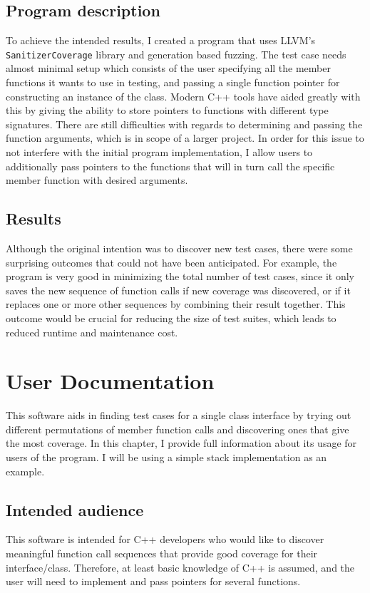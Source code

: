 \documentclass{elteikthesis}[2018/06/06]
\newcommand*{\code}{\lstinline[keywordstyle=\color{violet}, basicstyle=\color{violet}]}
\begin{document}
\section{Program description}
\label{sec-1-3}
To achieve the intended results, I created a program that uses LLVM's \code{SanitizerCoverage} library and generation based fuzzing. The test case needs almost minimal setup which consists of the user specifying all the member functions it wants to use in testing, and passing a single function pointer for constructing an instance of the class. Modern C++ tools have aided greatly with this by giving the ability to store pointers to functions with different type signatures. There are still difficulties with regards to determining and passing the function arguments, which is in scope of a larger project. In order for this issue to not interfere with the initial program implementation, I allow users to additionally pass pointers to the functions that will in turn call the specific member function with desired arguments. \\

\section{Results}
\label{sec-1-4}
Although the original intention was to discover new test cases, there were some surprising outcomes that could not have been anticipated. For example, the program is very good in minimizing the total number of test cases, since it only saves the new sequence of function calls if new coverage was discovered, or if it replaces one or more other sequences by combining their result together. This outcome would be crucial for reducing the size of test suites, which leads to reduced runtime and maintenance cost. \\
\chapter{User Documentation}
\label{sec-2}
This software aids in finding test cases for a single class interface by trying out different permutations of member function calls and discovering ones that give the most coverage. In this chapter, I provide full information about its usage for users of the program. I will be using a simple stack implementation as an example\cite{stack implementation}. \\
\section{Intended audience}
\label{sec-2-1}
This software is intended for C++ developers who would like to discover meaningful function call sequences that provide good coverage for their interface/class. Therefore, at least basic knowledge of C++ is assumed, and the user will need to implement and pass pointers for several functions. \\
\end{document}
